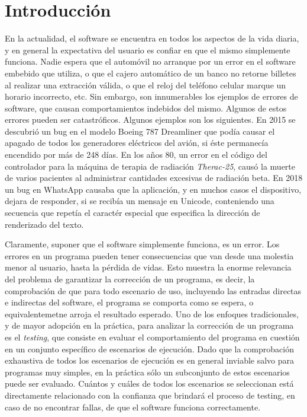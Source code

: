 \chapter{Introducci\'on}
\label{cap:introduccion}

En la actualidad, el software se encuentra en todos los aspectos de la vida diaria, y en general la expectativa del usuario es confiar en que el mismo simplemente funciona. Nadie espera que el autom\'ovil no arranque por un error en el software embebido que utiliza, o que el cajero autom\'atico de un banco no retorne billetes al realizar una extracci\'on v\'alida, o que el reloj del tel\'efono celular marque un horario incorrecto, etc. Sin embargo, son innumerables los ejemplos de errores de software, que causan comportamientos indebidos del mismo. Algunos de estos errores pueden ser catastr\'oficos. Algunos ejemplos son los siguientes. En 2015 se descubri\'o un bug en el modelo Boeing 787 Dreamliner que pod\'ia causar el apagado de todos los generadores el\'ectricos del avi\'on, si \'este permanec\'ia encendido por m\'as de 248 d\'ias. En los a\~nos 80, un error en el c\'odigo del controlador para la m\'aquina de terapia de radiaci\'on \emph{Therac-25}, caus\'o la muerte de varios pacientes al administrar cantidades excesivas de radiaci\'on beta. En 2018 un bug en WhatsApp causaba que la aplicaci\'on, y en muchos casos el dispositivo, dejara de responder, si se recib\'ia un mensaje en Unicode, conteniendo una secuencia que repet\'ia el caract\'er especial que especifica la direcci\'on de renderizado del texto.

Claramente, suponer que el software simplemente funciona, es un error. Los errores en un programa pueden tener consecuencias que van desde una molestia menor al usuario, hasta la p\'erdida de vidas. Esto muestra la enorme relevancia del problema de garantizar la correcci\'on de un programa, es decir, la comprobaci\'on de que para todo escenario de uso, incluyendo las entradas directas e indirectas del software, el programa se comporta como se espera, o equivalentemetne arroja el resultado esperado. Uno de los enfoques tradicionales, y de mayor adopci\'on en la pr\'actica, para analizar la correcci\'on de un programa es el \emph{testing}, que consiste en evaluar el comportamiento del programa en cuesti\'on en un conjunto espec\'ifico de escenarios de ejecuci\'on. Dado que la comprobaci\'on exhaustiva de todos los escenarios de ejecuci\'on es en general inviable salvo para programas muy simples, en la pr\'actica s\'olo un subconjunto de estos escenarios puede ser evaluado. Cu\'antos y cu\'ales de todos los escenarios se seleccionan est\'a directamente relacionado con la confianza que brindar\'a el proceso de testing, en caso de no encontrar fallas, de que el software funciona correctamente.

